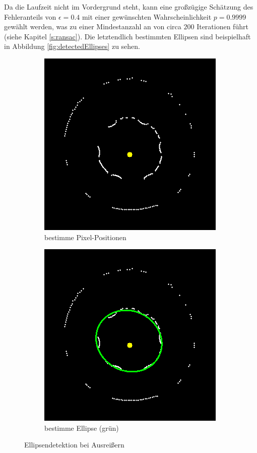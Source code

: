 Da die Laufzeit nicht im Vordergrund steht, kann eine großzügige Schätzung des Fehleranteils von $\epsilon = 0.4$ mit einer gewünschten Wahrscheinlichkeit $p = 0.9999$ gewählt werden, was zu einer Mindestanzahl an von circa $200$ Iterationen führt (siehe Kapitel \ref{s:ransac}). Die letztendlich bestimmten Ellipsen sind beispielhaft in Abbildung \ref{fig:detectedEllipses} zu sehen.


\begin{figure}[!htb]
	\centering
	\begin{subfigure}{.5\textwidth}
		\centering
		\includegraphics[scale=.6]{images/rayCastRobust.png}
		\caption{bestimme Pixel-Positionen}
		\label{fig:rayCastRWOE}
	\end{subfigure}%
	\begin{subfigure}{.5\textwidth}
		\centering
		\includegraphics[scale=.6]{images/rayCastRobustEllipse.png}
		\caption{bestimme Ellipse (grün)}
		\label{fig:rayCastRWE}
	\end{subfigure}
	\caption{Ellipsendetektion bei Ausreißern}
	\label{fig:rayCastR}
\end{figure}



